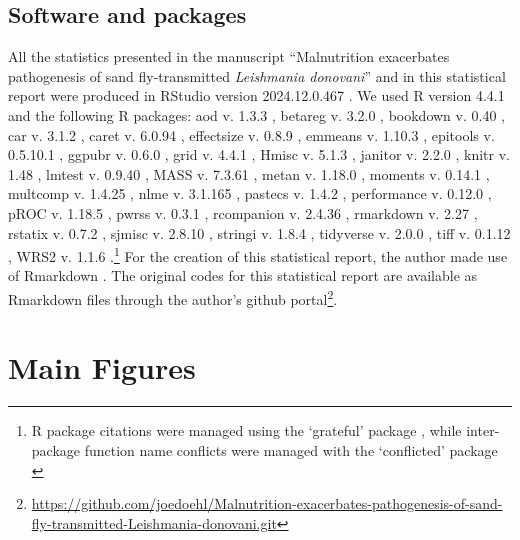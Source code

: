 \documentclass[
  12pt,
  letterpaper,
]{article}
\DeclareRobustCommand{\href}[2]{#2\footnote{\url{#1}}}
\begin{document}
\subsection{Software and packages}\label{software-and-packages}

All the statistics presented in the manuscript ``Malnutrition exacerbates pathogenesis of sand fly-transmitted \emph{Leishmania donovani}'' and in this statistical report were produced in RStudio version 2024.12.0.467 \autocite{team2023}. We used R version 4.4.1 \autocite{base} and the following R packages: aod v. 1.3.3 \autocite{aod}, betareg v. 3.2.0 \autocite{betareg2010,betareg2012,betareg2024}, bookdown v. 0.40 \autocite{bookdown2016,bookdown2024}, car v. 3.1.2 \autocite{car}, caret v. 6.0.94 \autocite{caret}, effectsize v. 0.8.9 \autocite{effectsize}, emmeans v. 1.10.3 \autocite{emmeans}, epitools v. 0.5.10.1 \autocite{epitools}, ggpubr v. 0.6.0 \autocite{ggpubr}, grid v. 4.4.1 \autocite{grid}, Hmisc v. 5.1.3 \autocite{Hmisc}, janitor v. 2.2.0 \autocite{janitor}, knitr v. 1.48 \autocite{knitr2014,knitr2015,knitr2024}, lmtest v. 0.9.40 \autocite{lmtest}, MASS v. 7.3.61 \autocite{MASS}, metan v. 1.18.0 \autocite{metan}, moments v. 0.14.1 \autocite{moments}, multcomp v. 1.4.25 \autocite{multcomp}, nlme v. 3.1.165 \autocite{nlme2000,nlme2024}, pastecs v. 1.4.2 \autocite{pastecs}, performance v. 0.12.0 \autocite{performance}, pROC v. 1.18.5 \autocite{pROC}, pwrss v. 0.3.1 \autocite{pwrss}, rcompanion v. 2.4.36 \autocite{rcompanion}, rmarkdown v. 2.27 \autocite{rmarkdown2018,rmarkdown2020,rmarkdown2024}, rstatix v. 0.7.2 \autocite{rstatix}, sjmisc v. 2.8.10 \autocite{sjmisc}, stringi v. 1.8.4 \autocite{stringi}, tidyverse v. 2.0.0 \autocite{tidyverse}, tiff v. 0.1.12 \autocite{tiff}, WRS2 v. 1.1.6 \autocite{WRS2}.\footnote{R package citations were managed using the `grateful' package \autocite{grateful}, while inter-package function name conflicts were managed with the `conflicted' package \autocite{conflicted}} For the creation of this statistical report, the author made use of Rmarkdown \autocite{allaire2024}. The original codes for this statistical report are available as Rmarkdown files through the author's \href{https://github.com/joedoehl/Malnutrition-exacerbates-pathogenesis-of-sand-fly-transmitted-Leishmania-donovani.git}{github portal}.

\section{Main Figures}\label{main-figures}
\end{document}
